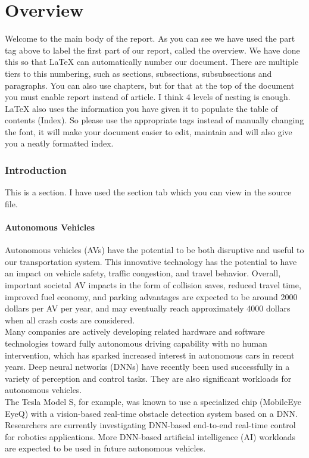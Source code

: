 \documentclass[ 12pt,a4paper,twocolumn,fleqn]{article}
\begin{document}
\part{Overview}
Welcome to the main body of the report. As you can see we have used the part tag above to label the first part of our report, called the overview. We have done this so that \LaTeX{} can automatically number our document. There are multiple tiers to this numbering, such as sections, subsections, subsubsections and paragraphs. You can also use chapters, but for that at the top of the document you must enable report instead of article. I think 4 levels of nesting is enough. \LaTeX{} also uses the information you have given it to populate the table of contents (Index). So please use the appropriate tags instead of manually changing the font, it will make your document easier to edit, maintain and will also give you a neatly formatted index.
\section{Introduction}
This is a section. I have used the section tab which you can view in the source file.
\subsection{Autonomous Vehicles}
Autonomous vehicles (AVs) have the potential to be both disruptive and useful to our transportation system. This innovative technology has the potential to have an impact on vehicle safety, traffic congestion, and travel behavior. Overall, important societal AV impacts in the form of collision saves, reduced travel time, improved fuel economy, and parking advantages are expected to be around 2000 dollars per AV per year, and may eventually reach approximately 4000 dollars when all crash costs are considered.\\
%
Many companies are actively developing related hardware and software technologies toward fully autonomous driving capability with no human intervention, which has sparked increased interest in autonomous cars in recent years. Deep neural networks (DNNs) have recently been used successfully in a variety of perception and control tasks. They are also significant workloads for autonomous vehicles.\\
%
The Tesla Model S, for example, was known to use a specialized chip (MobileEye EyeQ) with a vision-based real-time obstacle detection system based on a DNN. Researchers are currently investigating DNN-based end-to-end real-time control for robotics applications. More DNN-based artificial intelligence (AI) workloads are expected to be used in future autonomous vehicles.\\
\end{document}

